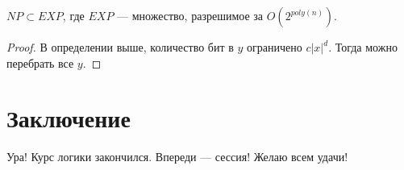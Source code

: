 \begin{proposition}
    \(NP \subset EXP\), где \(EXP\) --- множество, разрешимое за \(O(2^{poly(n)})\).
\end{proposition}
\begin{proof}
    В определении выше, количество бит в \(y\) ограничено \(c|x|^d\). Тогда можно перебрать все \(y\).
\end{proof}

\section{Заключение}
Ура! Курс логики закончился. Впереди --- сессия! Желаю всем удачи!